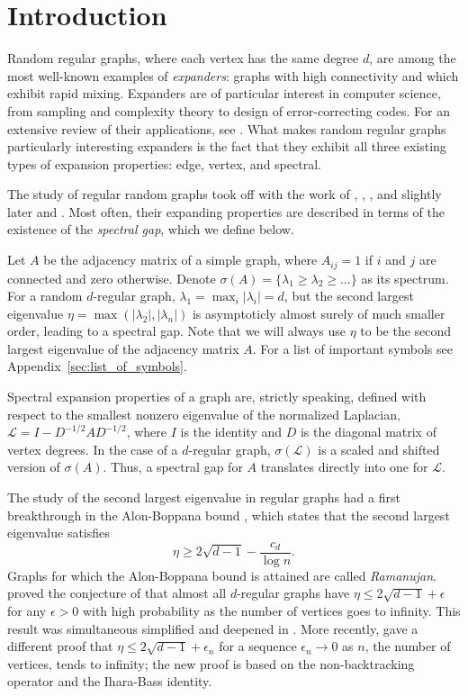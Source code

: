 \section{Introduction} \label{sec:intro}

Random regular graphs,
where each vertex has the same degree $d$,
are among the most well-known examples of {\it expanders}:
graphs with high connectivity and which exhibit rapid mixing.
Expanders are of particular interest in computer science, 
from sampling and complexity theory to design of error-correcting codes.
For an extensive review of their applications, see \cite*{hoory2006}.
What makes random regular graphs particularly interesting expanders 
is the fact that they exhibit all three existing
types of expansion properties: edge, vertex, and spectral. 

The study of regular random graphs took off with the work of
\citet*{bender1974}, \citet*{bender1978},
\citet*{bollobas1980},
and slightly later \citet*{mckay1984} and \citet*{wormald1981}. 
Most often, their expanding properties are described 
in terms of the existence of the \emph{spectral gap}, which we define below. 

Let $A$ be the adjacency matrix of a simple graph,
where $A_{ij} = 1$ if $i$ and $j$ are connected and zero otherwise.
Denote
$\sigma(A) = \{\lambda_1 \geq \lambda_2 \geq \ldots \}$
as its spectrum. 
For a random $d$-regular graph, $\lambda_1 = \max_{i} |\lambda_i| = d$, 
but the second largest eigenvalue
$\eta = \max (|\lambda_2|, |\lambda_{n}| )$ 
is asymptoticly almost surely 
of much smaller order, leading to a spectral gap.
Note that we will always use $\eta$ to be the second largest 
eigenvalue of the adjacency matrix $A$.
For a list of important symbols see Appendix~\ref{sec:list_of_symbols}.

Spectral expansion properties of a graph are, strictly speaking,
defined with respect to the smallest nonzero eigenvalue of the normalized Laplacian,
$\mathcal{L} = I - D^{-1/2} A D^{-1/2}$, 
where $I$ is the identity and $D$ is the diagonal matrix of vertex degrees.
In the case of a $d$-regular graph, $\sigma(\mathcal{L})$ is a scaled
and shifted version of $\sigma(A)$.
Thus, a spectral gap for $A$ translates directly into one for $\mathcal{L}$.

The study of the second largest eigenvalue in regular graphs 
had a first breakthrough in the Alon-Boppana bound 
\citet*{alon1986},
which states that the second largest eigenvalue satisfies
\[
 \eta \geq 2 \sqrt{d-1} - \frac{c_d}{\log n} .
\]
Graphs for which the Alon-Boppana bound is attained are called {\it Ramanujan}.
\citet*{friedman2003a} proved the conjecture of \citet*{alon1986} that
almost all $d$-regular graphs have $\eta \leq 2 \sqrt{d-1} + \epsilon$
for any $\epsilon > 0$
with high probability as the number of vertices goes to infinity. This result was simultaneous simplified and deepened in \citet*{friedman2014}. 
More recently, \citet*{bordenave2015} gave a different proof that
$\eta \leq 2 \sqrt{d-1}+\epsilon_n$ 
for a sequence $\epsilon_n \rightarrow 0$ as $n$, 
the number of vertices, tends to infinity; the new proof is based on the non-backtracking operator and the Ihara-Bass identity.  


